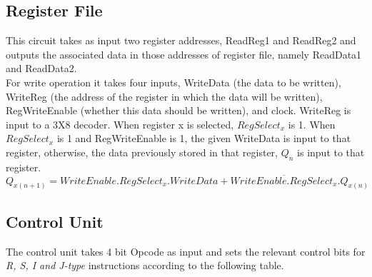 \documentclass[12]{article}
\begin{document}
\subsection{Register File}
\large
	This circuit takes as input two register addresses, ReadReg1 and ReadReg2 and outputs the associated data in those addresses of register file, namely ReadData1 and ReadData2.\\
	For write operation it takes four inputs, WriteData (the data to be written), WriteReg (the address of the register in which the data will be written), RegWriteEnable (whether this data should be written), and clock. WriteReg is input to a 3X8 decoder. When register x is selected, $RegSelect_{x}$ is 1. When $RegSelect_{x}$ is 1 and RegWriteEnable is 1, the given WriteData is input to that register, otherwise, the data previously stored in that register, $Q_n$ is input to that register. $$ Q_{x(n + 1)} = WriteEnable.RegSelect_x.WriteData + \overline{WriteEnable.RegSelect_x}.Q_{x(n)}$$

\newpage

\subsection{Control Unit}
\large
The control unit takes 4 bit Opcode as input and sets the relevant control bits for \textit{R, S, I and J-type} instructions according to the following table.
\end{document}
